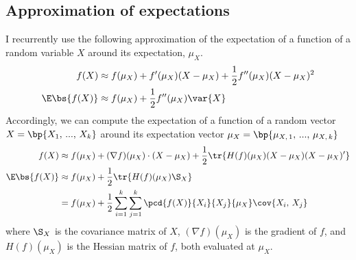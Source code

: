 \subsection{Approximation of expectations}

I recurrently use the following approximation of the expectation of a function of a random variable $X$ around its expectation, $\mu_X$.
\begin{align*}
    f(X) &\approx f(\mu_X) + f'(\mu_X)(X - \mu_X) + \frac{1}{2}f''(\mu_X)(X - \mu_X)^2\\
    \E\bs{f(X)} &\approx f(\mu_X) + \frac{1}{2}f''(\mu_X)\var{X}
\end{align*}
Accordingly, we can compute the expectation of a function of a random vector $X = \bp{X_1,\,...,\,X_k}$ around its expectation vector $\mu_X = \bp{\mu_{X,\,1},\,...,\,\mu_{X,\,k}}$
\begin{align*}
    f(X) &\approx f(\mu_X) + (\nabla f)(\mu_X)\cdot(X - \mu_X) + \frac{1}{2}\tr{H(f)(\mu_X)(X - \mu_X)(X - \mu_X)'}\\
    \E\bs{f(X)} & \approx f(\mu_X) + \frac{1}{2}\tr{H(f)(\mu_X)\S_X}\\
    &= f(\mu_X) + \frac{1}{2}\sum_{i=1}^{k}\sum_{j=1}^{k}\pcd{f(X)}{X_i}{X_j}{\mu_X}\cov{X_i,\,X_j}
\end{align*}
where $\S_X$ is the covariance matrix of $X$, $(\nabla f)(\mu_X)$ is the gradient of $f$, and $H(f)(\mu_X)$ is the Hessian matrix of $f$, both evaluated at $\mu_X$.